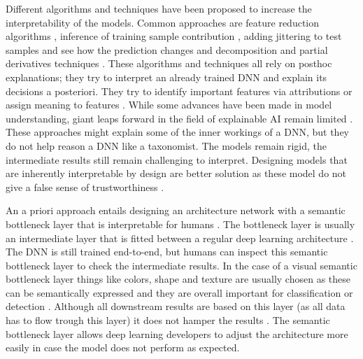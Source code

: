 \documentclass[a4paper, 12pt, oneside]{book} %
\begin{document}
Different algorithms and techniques have been proposed to increase the interpretability of the models.
Common approaches are feature reduction algorithms \autocite{ribeiro_why_2016}, inference of training sample contribution \autocite{koh_understanding_2020}, adding jittering to test samples and see how the prediction changes \autocite{li_understanding_2017} and decomposition and partial derivatives techniques \autocite{samek_explainable_2017}.
These algorithms and techniques all rely on posthoc explanations; they try to interpret an already trained DNN and explain its decisions a posteriori.
They try to identify important features via attributions \autocite{zintgraf_visualizing_2017, selvaraju_grad-cam_2017} or assign meaning to features \autocite{fleet_visualizing_2014}.
While some advances have been made in model understanding, giant leaps forward in the field of explainable AI remain limited \autocite{lipton_mythos_2017, li_interpretable_2021}.
These approaches might explain some of the inner workings of a DNN, but they do not help reason a DNN like a taxonomist.
The models remain rigid, the intermediate results still remain challenging to interpret.
Designing models that are inherently interpretable by design are better solution as these model do not give a false sense of trustworthiness \autocite{rudin_stop_2019}.

An a priori approach entails designing an architecture network with a semantic bottleneck layer that is interpretable for humans \autocite{bucher_semantic_2019}. 
The bottleneck layer is usually an intermediate layer that is fitted between a regular deep learning architecture \autocite{bucher_semantic_2019}.
The DNN is still trained end-to-end, but humans can inspect this semantic bottleneck layer to check the intermediate results.
In the case of a visual semantic bottleneck layer things like colors, shape and texture are usually chosen as these can be semantically expressed and they are overall important for classification or detection \autocite{yosinski_understanding_2015, fleet_visualizing_2014}.
Although all downstream results are based on this layer (as all data has to flow trough this layer) it does not hamper the results \autocite{bucher_semantic_2019}.
The semantic bottleneck layer allows deep learning developers to adjust the architecture more easily in case the model does not perform as expected.
\end{document}

